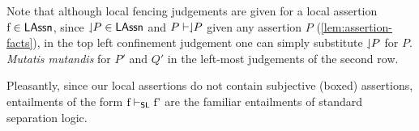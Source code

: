 Note that although local fencing judgements are given for a local assertion $\lass{f} \in \LAssertions$, since $\downharpoonleft\!\! P \in \textsf{LAssn}$ and $P \vdash \downharpoonleft\!\! P$ given any assertion $P$ (\lem\ref{lem:assertion-facts}), in the top left confinement judgement one can simply substitute $\downharpoonleft\!\! P$ for $P$. \textit{Mutatis mutandis} for $P'$ and $Q'$ in the left-most judgements of the second row.

Pleasantly, since our local assertions do not contain subjective (boxed) assertions, entailments of the form $\lass{f} \slentails \lass{f'}$ are the familiar entailments of standard separation logic.
%
